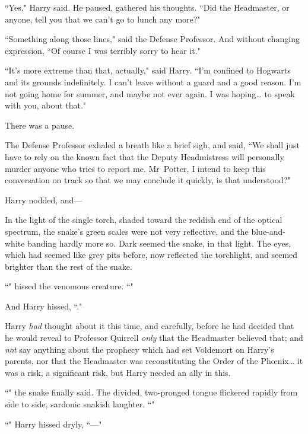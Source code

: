``Yes," Harry said. He paused, gathered his thoughts. ``Did the Headmaster, or anyone, tell you that we can't go to lunch any more?"

``Something along those lines," said the Defense Professor. And without changing expression, ``Of course I was terribly sorry to hear it."

``It's more extreme than that, actually," said Harry. ``I'm confined to Hogwarts and its grounds indefinitely. I can't leave without a guard and a good reason. I'm not going home for summer, and maybe not ever again. I was hoping{\ldots} to speak with you, about that."

There was a pause.

The Defense Professor exhaled a breath like a brief sigh, and said, ``We shall just have to rely on the known fact that the Deputy Headmistress will personally murder anyone who tries to report me. Mr~Potter, I intend to keep this conversation on track so that we may conclude it quickly, is that understood?"

Harry nodded, and—

In the light of the single torch, shaded toward the reddish end of the optical spectrum, the snake's green scales were not very reflective, and the blue-and-white banding hardly more so. Dark seemed the snake, in that light. The eyes, which had seemed like grey pits before, now reflected the torchlight, and seemed brighter than the rest of the snake.

``" hissed the venomous creature. ``"

And Harry hissed, ``."

Harry \emph{had} thought about it this time, and carefully, before he had decided that he would reveal to Professor Quirrell \emph{only} that the Headmaster believed that; and \emph{not} say anything about the prophecy which had set Voldemort on Harry's parents, nor that the Headmaster was reconstituting the Order of the Phœnix{\ldots} it was a risk, a significant risk, but Harry needed an ally in this.

``" the snake finally said. The divided, two-pronged tongue flickered rapidly from side to side, sardonic snakish laughter. ``"

``" Harry hissed dryly, ``—"

